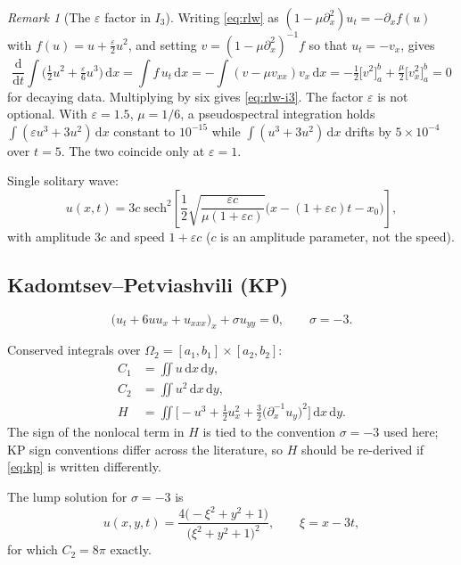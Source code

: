 \documentclass[11pt,a4paper]{article}
\theoremstyle{remark}
\newtheorem{remark}{Remark}
\newcommand{\dx}{\,\mathrm{d}x}
\newcommand{\dy}{\,\mathrm{d}y}
\newcommand{\Om}{\Omega}
\begin{document}
\begin{remark}[The $\varepsilon$ factor in $I_3$]
Writing \eqref{eq:rlw} as $(1-\mu\partial_x^2)u_t = -\partial_x f(u)$ with
$f(u) = u + \tfrac{\varepsilon}{2}u^2$, and setting
$v = (1-\mu\partial_x^2)^{-1}f$ so that $u_t = -v_x$, gives
\begin{equation}
\frac{\mathrm d}{\mathrm dt}\int\Big(\tfrac12 u^2 + \tfrac{\varepsilon}{6}u^3\Big)\dx
= \int f\,u_t \dx = -\int (v-\mu v_{xx})v_x\dx
= -\tfrac12\big[v^2\big]_a^b + \tfrac{\mu}{2}\big[v_x^2\big]_a^b = 0
\end{equation}
for decaying data. Multiplying by six gives \eqref{eq:rlw-i3}. The factor
$\varepsilon$ is not optional. With $\varepsilon = 1.5$, $\mu = 1/6$, a
pseudospectral integration holds $\int(\varepsilon u^3+3u^2)\dx$ constant to
$10^{-15}$ while $\int(u^3+3u^2)\dx$ drifts by $5\times10^{-4}$ over $t=5$.
The two coincide only at $\varepsilon = 1$.
\end{remark}

Single solitary wave:
\begin{equation}
u(x,t) = 3c\;\mathrm{sech}^2\!\left[\frac{1}{2}\sqrt{\frac{\varepsilon c}{\mu(1+\varepsilon c)}}
\Big(x - (1+\varepsilon c)t - x_0\Big)\right],
\label{eq:rlw-soliton}
\end{equation}
with amplitude $3c$ and speed $1+\varepsilon c$ ($c$ is an amplitude parameter,
not the speed).

\subsection{Kadomtsev--Petviashvili (KP)}

\begin{equation}
\big(u_t + 6uu_x + u_{xxx}\big)_x + \sigma u_{yy} = 0, \qquad \sigma = -3 .
\label{eq:kp}
\end{equation}

Conserved integrals over $\Om_2 = [a_1,b_1]\times[a_2,b_2]$:
\begin{align}
C_1 &= \iint u \dx\dy, \\
C_2 &= \iint u^2 \dx\dy, \\
H &= \iint \Big[-u^3 + \tfrac12 u_x^2 + \tfrac32 \big(\partial_x^{-1}u_y\big)^2\Big]\dx\dy .
\end{align}
The sign of the nonlocal term in $H$ is tied to the convention $\sigma = -3$
used here; KP sign conventions differ across the literature, so $H$ should be
re-derived if \eqref{eq:kp} is written differently.

The lump solution for $\sigma=-3$ is
\begin{equation}
u(x,y,t) = \frac{4\big(-\xi^2 + y^2 + 1\big)}{\big(\xi^2+y^2+1\big)^2},
\qquad \xi = x - 3t,
\end{equation}
for which $C_2 = 8\pi$ exactly.
\end{document}
